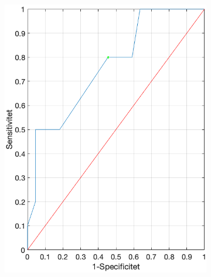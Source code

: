 \begin{figure} [H]
	\centering
	\begin{subfigure}{0.49\textwidth} %
		\includegraphics[width=\textwidth]{billeder/ROC.png}
	\end{subfigure}
	\vspace{1em}
	\begin{subfigure}{0.49\textwidth} 

\end{subfigure}
\end{figure}
